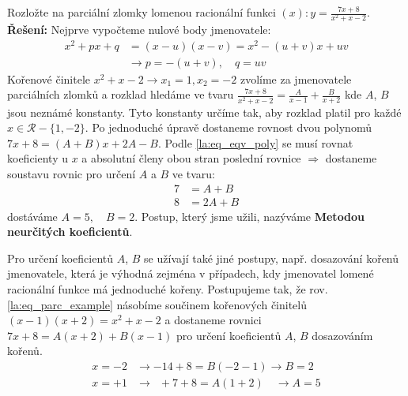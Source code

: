 \begin{mdframed}[style=mdexam]
  \begin{example}\label{mai:exam015}
    Rozložte na parciální zlomky lomenou racionální funkci \((x):y=\frac{7x+8}{x^2+x-2}\).
    \newline\textbf{Řešení:} Nejprve vypočteme nulové body jmenovatele:
    \begin{align*} 
      x^2+px+q &=(x-u)(x-v) = x^2-(u+v)x+uv            \\
                &\rightarrow p=-(u+v),\quad q=uv
    \end{align*}
    Kořenové činitele  \(x^2+x-2\rightarrow x_1=1, x_2=-2\) zvolíme za jmenovatele parciálních
    zlomků a rozklad hledáme ve tvaru \(\frac{7x+8}{x^2+x-2}=\frac{A}{x-1}+\frac{B}{x+2}\)
    kde \(A\), \(B\) jsou neznámé konstanty. Tyto konstanty určíme tak, aby rozklad platil pro 
    každé \(x\in\mathcal{R}-\{1,-2\}\). Po jednoduché úpravě dostaneme rovnost dvou polynomů
    \(7x+8=(A+B)x+2A-B\). Podle \ref{la:eq_eqv_poly} se musí rovnat koeficienty u \(x\) a absolutní 
    členy obou stran poslední rovnice \(\Rightarrow\) dostaneme soustavu rovnic pro určení \(A\) a 
    \(B\) ve tvaru:
    \begin{align}
      7 &= A+B  \nonumber \\ 
      8 &= 2A+B \label{la:eq_parc_example}   
    \end{align}
    dostáváme \(A=5,\quad B=2\). Postup, který jsme užili, nazýváme \textbf{Metodou neurčitých 
    koeficientů}.
    
    Pro určení koeficientů \(A\), \(B\) se užívají také jiné postupy, např. dosazování
    kořenů jmenovatele, která je výhodná zejména v případech, kdy jmenovatel lomené racionální
    funkce má jednoduché kořeny. Postupujeme tak, že rov. \ref{la:eq_parc_example} násobíme
    součinem kořenových činitelů \((x-1)(x+2)=x^2+x-2\) a dostaneme rovnici 
    \(7x+8=A(x+2)+B(x-1)\) pro určení koeficientů \(A\), \(B\) dosazováním kořenů.
      \begin{align*}
        x=-2 &\rightarrow       -14+8=B(-2-1)      \rightarrow B=2\\
        x=+1 &\rightarrow  \,\,\,+7+8=A(1+2)\quad  \rightarrow A=5
      \end{align*}
  \end{example}
\end{mdframed}